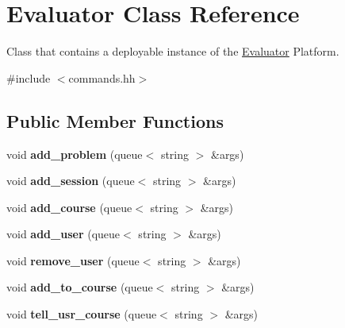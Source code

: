 \hypertarget{classEvaluator}{}\section{Evaluator Class Reference}
\label{classEvaluator}


Class that contains a deployable instance of the \hyperlink{classEvaluator}{Evaluator} Platform.  




{\ttfamily \#include $<$commands.\+hh$>$}

\subsection*{Public Member Functions}
\begin{DoxyCompactItemize}
\item 
\mbox{\label{classEvaluator_ae264b99641096c28f59000479701cce1}} 
void {\bfseries add\+\_\+problem} (queue$<$ string $>$ \&args)
\item 
\mbox{\label{classEvaluator_a83a0348f4d6c5ce8c68e7912275ee3d5}} 
void {\bfseries add\+\_\+session} (queue$<$ string $>$ \&args)
\item 
\mbox{\label{classEvaluator_a4fa3385de8d161826a12ad1122d8ed16}} 
void {\bfseries add\+\_\+course} (queue$<$ string $>$ \&args)
\item 
\mbox{\label{classEvaluator_ab60769a5f935a804f32d58f47e2c3993}} 
void {\bfseries add\+\_\+user} (queue$<$ string $>$ \&args)
\item 
\mbox{\label{classEvaluator_acc37cb27847b9c708a3c24062e9e5164}} 
void {\bfseries remove\+\_\+user} (queue$<$ string $>$ \&args)
\item 
\mbox{\label{classEvaluator_a859ac5e45e9c6d36adc00d51056286bf}} 
void {\bfseries add\+\_\+to\+\_\+course} (queue$<$ string $>$ \&args)
\item 
\mbox{\label{classEvaluator_ace3f4bbb01981e5f3d66f3eb593a1c1a}} 
void {\bfseries tell\+\_\+usr\+\_\+course} (queue$<$ string $>$ \&args)
\item 
\mbox{\label{classEvaluator_a88ed76955bc60c1f0e1c21c895f119f7}} 

\end{DoxyCompactItemize}
